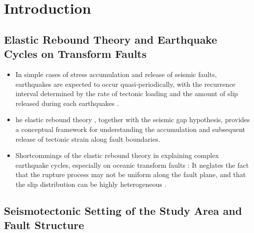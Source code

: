 \section{Introduction}

\subsection{Elastic Rebound Theory and Earthquake Cycles on Transform Faults}

\begin{itemize} 
    \item In simple cases of stress accumulation and release of seismic faults, earthquakes are expected to occur quasi-periodically, with the recurrence 
    interval determined by the rate of tectonic loading and the amount of slip released during each earthquakes \cite{stress2003}. 
    \item he elastic rebound theory \cite{Reid1910}, together with the seismic gap hypothesis, provides a conceptual framework for understanding the
     accumulation and subsequent release of tectonic strain along fault boundaries.
    \item Shortcommings of the elastic rebound theory in explaining complex earthquake cycles, especially on oceanic transform faults : It neglates the fact 
    that the rupture process may not be uniform along the fault plane, and that the slip distribution can be highly heterogeneous \cite{heaton1990}. 
\end{itemize}
\subsection{Seismotectonic Setting of the Study Area and Fault Structure}

